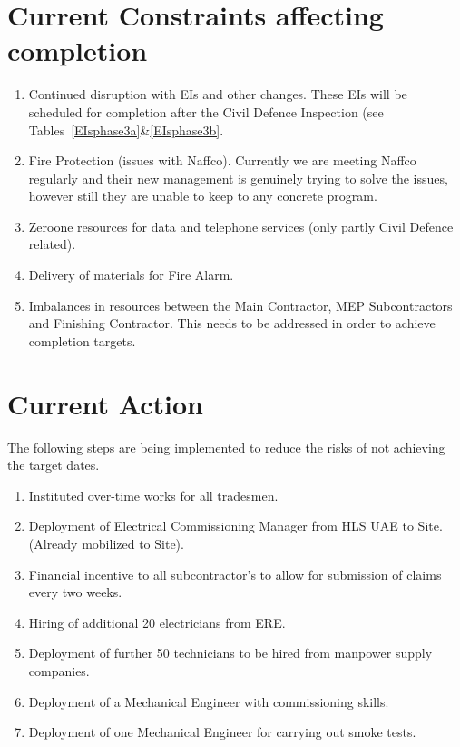 \section*{Current Constraints affecting completion}

\begin{enumerate}
\item Continued disruption with EIs and other changes. These EIs will be scheduled for completion after the Civil Defence Inspection (see Tables~\ref{EIsphase3a}\&\ref{EIsphase3b}.
\item Fire Protection (issues with Naffco). Currently we are meeting Naffco regularly and their new management is genuinely trying to solve the issues, however still they are unable to keep to any concrete program.
\item Zeroone resources for data and telephone services (only partly Civil Defence related).
\item Delivery of materials for Fire Alarm. 
\item Imbalances in resources between the Main Contractor, MEP Subcontractors and Finishing Contractor. This needs to be addressed in order to achieve completion targets.
\end{enumerate}

\section*{Current Action}

The following steps are being implemented to reduce the risks of not achieving the target dates.

\begin{enumerate}
\item  Instituted over-time works for all tradesmen.
\item  Deployment of Electrical Commissioning Manager from HLS UAE to Site. (Already mobilized to Site).
\item  Financial incentive to all subcontractor's to allow for submission of claims every two weeks.
\item  Hiring of additional 20 electricians from ERE.
\item  Deployment of further 50 technicians to be hired from manpower supply companies.
\item  Deployment of a Mechanical Engineer with commissioning skills.
\item  Deployment of one Mechanical Engineer for carrying out smoke tests.
\end{enumerate}


